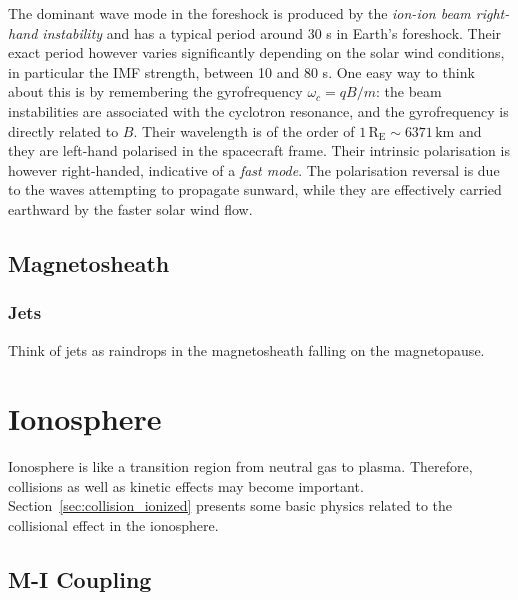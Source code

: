 \documentclass[
  notoc %
]{tufte-book}
\begin{document}
The dominant wave mode in the foreshock is produced by the \emph{ion-ion
beam right-hand instability} and has a typical period around 30 s in
Earth's foreshock. Their exact period however varies significantly
depending on the solar wind conditions, in particular the IMF strength,
between 10 and 80 s. One easy way to think about this is by remembering
the gyrofrequency \(\omega_c=qB/m\): the beam instabilities are
associated with the cyclotron resonance, and the gyrofrequency is
directly related to \(B\). Their wavelength is of the order of
\(1\,\text{R}_\text{E}\sim 6371\, \text{km}\) and they are left-hand
polarised in the spacecraft frame. Their intrinsic polarisation is
however right-handed, indicative of a \emph{fast mode}. The polarisation
reversal is due to the waves attempting to propagate sunward, while they
are effectively carried earthward by the faster solar wind flow.

\hypertarget{magnetosheath}{%
\section{Magnetosheath}\label{magnetosheath}}

\hypertarget{jets}{%
\subsection{Jets}\label{jets}}

Think of jets as raindrops in the magnetosheath falling on the
magnetopause.

\hypertarget{sec:iono}{%
\chapter{Ionosphere}\label{sec:iono}}

Ionosphere is like a transition region from neutral gas to plasma.
Therefore, collisions as well as kinetic effects may become important.
Section~\ref{sec:collision_ionized} presents some basic physics related
to the collisional effect in the ionosphere.

\hypertarget{sec:MI_coupling}{%
\section{M-I Coupling}\label{sec:MI_coupling}}
\end{document}
